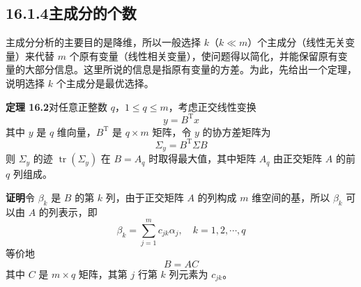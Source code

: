 \documentclass[UTF8, 12pt, fontset=fandol, oneside]{ctexart}
\begin{document}
\subsection*{16.1.4\quad 主成分的个数}

主成分分析的主要目的是降维，所以一般选择 $k$（$k\ll m$）个主成分（线性无关变量）来代替 $m$ 个原有变量（线性相关变量），使问题得以简化，并能保留原有变量的大部分信息。这里所说的信息是指原有变量的方差。为此，先给出一个定理，说明选择 $k$ 个主成分是最优选择。

\noindent\textbf{定理 16.2}\quad 对任意正整数 $q$，$1\leqslant q\leqslant m$，考虑正交线性变换
\begin{equation}
y=B^{\mathrm{T}}x
\tag{16.23}
\end{equation}
其中 $y$ 是 $q$ 维向量，$B^{\mathrm{T}}$ 是 $q\times m$ 矩阵，令 $y$ 的协方差矩阵为
\begin{equation}
\Sigma_y=B^{\mathrm{T}}\Sigma B
\tag{16.24}
\end{equation}
则 $\Sigma_y$ 的迹 $\operatorname{tr}(\Sigma_y)$ 在 $B=A_q$ 时取得最大值，其中矩阵 $A_q$ 由正交矩阵 $A$ 的前 $q$ 列组成。

\noindent\textbf{证明}\quad 令 $\beta_k$ 是 $B$ 的第 $k$ 列，由于正交矩阵 $A$ 的列构成 $m$ 维空间的基，所以 $\beta_k$ 可以由 $A$ 的列表示，即
\[
\beta_k=\sum_{j=1}^m c_{jk}\alpha_j,\quad k=1,2,\cdots,q
\]
等价地
\begin{equation}
B=AC
\tag{16.25}
\end{equation}
其中 $C$ 是 $m\times q$ 矩阵，其第 $j$ 行第 $k$ 列元素为 $c_{jk}$。
\end{document}
